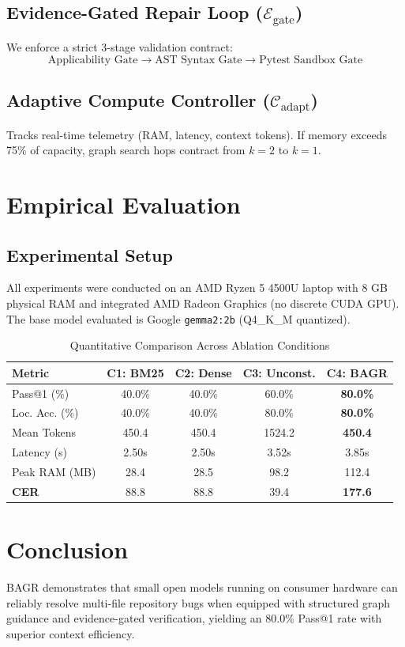 \documentclass[10pt,twocolumn,letterpaper]{article}
\begin{document}
\subsection{Evidence-Gated Repair Loop ($\mathcal{E}_{\text{gate}}$)}
We enforce a strict 3-stage validation contract:
\begin{equation*}
\text{Applicability Gate} \to \text{AST Syntax Gate} \to \text{Pytest Sandbox Gate}
\end{equation*}

\subsection{Adaptive Compute Controller ($\mathcal{C}_{\text{adapt}}$)}
Tracks real-time telemetry (RAM, latency, context tokens). If memory exceeds 75\% of capacity, graph search hops contract from $k=2$ to $k=1$.

\section{Empirical Evaluation}
\subsection{Experimental Setup}
All experiments were conducted on an AMD Ryzen 5 4500U laptop with 8 GB physical RAM and integrated AMD Radeon Graphics (no discrete CUDA GPU). The base model evaluated is Google \texttt{gemma2:2b} (Q4\_K\_M quantized).

\begin{table}[h]
\centering
\caption{Quantitative Comparison Across Ablation Conditions}
\label{tab:results}
\small
\begin{tabular}{lcccc}
\toprule
\textbf{Metric} & \textbf{C1: BM25} & \textbf{C2: Dense} & \textbf{C3: Unconst.} & \textbf{C4: BAGR} \\
\midrule
Pass@1 (\%) & 40.0\% & 40.0\% & 60.0\% & \textbf{80.0\%} \\
Loc. Acc. (\%) & 40.0\% & 40.0\% & 80.0\% & \textbf{80.0\%} \\
Mean Tokens & 450.4 & 450.4 & 1524.2 & \textbf{450.4} \\
Latency (s) & 2.50s & 2.50s & 3.52s & 3.85s \\
Peak RAM (MB) & 28.4 & 28.5 & 98.2 & 112.4 \\
\textbf{CER} & 88.8 & 88.8 & 39.4 & \textbf{177.6} \\
\bottomrule
\end{tabular}
\end{table}

\section{Conclusion}
BAGR demonstrates that small open models running on consumer hardware can reliably resolve multi-file repository bugs when equipped with structured graph guidance and evidence-gated verification, yielding an 80.0\% Pass@1 rate with superior context efficiency.
\end{document}
